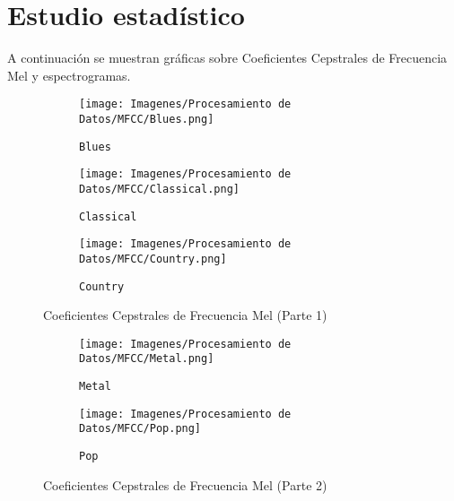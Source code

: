 \documentclass{article}
\begin{document}
\section{Estudio estadístico}
A continuación se muestran gráficas sobre Coeficientes Cepstrales de Frecuencia Mel y espectrogramas.

\begin{figure}[htbp]
    \centering

    \begin{subfigure}{0.9\textwidth}
        \centering
        \texttt{[image: Imagenes/Procesamiento de Datos/MFCC/Blues.png]}
        \caption{\texttt{Blues}}
    \end{subfigure}
    \vspace{0.5cm}

    \begin{subfigure}{0.9\textwidth}
        \centering
        \texttt{[image: Imagenes/Procesamiento de Datos/MFCC/Classical.png]}
        \caption{\texttt{Classical}}
    \end{subfigure}
    \vspace{0.5cm}

    \begin{subfigure}{0.9\textwidth}
        \centering
        \texttt{[image: Imagenes/Procesamiento de Datos/MFCC/Country.png]}
        \caption{\texttt{Country}}
    \end{subfigure}

    \caption{Coeficientes Cepstrales de Frecuencia Mel (Parte 1)}
    \label{fig:5x1grid-part1}
\end{figure}

\begin{figure}[htbp]
    \ContinuedFloat
    \centering

    \begin{subfigure}{0.9\textwidth}
        \centering
        \texttt{[image: Imagenes/Procesamiento de Datos/MFCC/Metal.png]}
        \caption{\texttt{Metal}}
    \end{subfigure}
    \vspace{0.5cm}

    \begin{subfigure}{0.9\textwidth}
        \centering
        \texttt{[image: Imagenes/Procesamiento de Datos/MFCC/Pop.png]}
        \caption{\texttt{Pop}}
    \end{subfigure}

    \caption{Coeficientes Cepstrales de Frecuencia Mel (Parte 2)}
    \label{fig:5x1grid-part2}
\end{figure}
\end{document}
